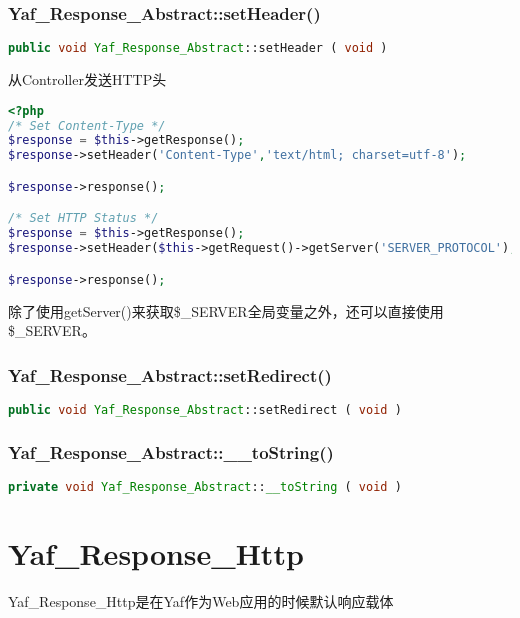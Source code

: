 \subsection{Yaf\_Response\_Abstract::setHeader()}


\begin{lstlisting}[language=PHP]
public void Yaf_Response_Abstract::setHeader ( void )
\end{lstlisting}

\begin{example}
从Controller发送HTTP头
\begin{lstlisting}[language=PHP]
<?php
/* Set Content-Type */
$response = $this->getResponse();
$response->setHeader('Content-Type','text/html; charset=utf-8');

$response->response();

/* Set HTTP Status */
$response = $this->getResponse();
$response->setHeader($this->getRequest()->getServer('SERVER_PROTOCOL'),'404 NOT FOUND');

$response->response();
\end{lstlisting}
\end{example}

除了使用getServer()来获取\$\_SERVER全局变量之外，还可以直接使用\$\_SERVER。


\subsection{Yaf\_Response\_Abstract::setRedirect()}


\begin{lstlisting}[language=PHP]
public void Yaf_Response_Abstract::setRedirect ( void )
\end{lstlisting}

\subsection{Yaf\_Response\_Abstract::\_\_toString()}


\begin{lstlisting}[language=PHP]
private void Yaf_Response_Abstract::__toString ( void )
\end{lstlisting}


\chapter{Yaf\_Response\_Http}

Yaf\_Response\_Http是在Yaf作为Web应用的时候默认响应载体

